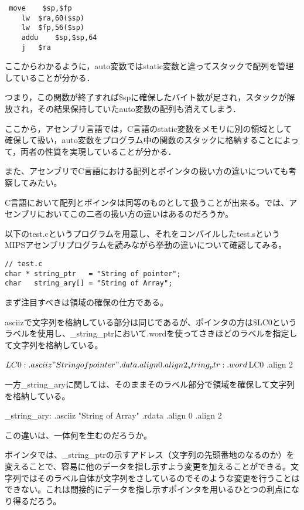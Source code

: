 \documentclass[a4j]{jarticle}
\begin{document}
\begin{verbatim}
 move    $sp,$fp
    lw  $ra,60($sp)
    lw  $fp,56($sp)
    addu    $sp,$sp,64
    j   $ra
\end{verbatim}

ここからわかるように，auto変数ではstatic変数と違ってスタックで配列を管理していることが分かる．

つまり，この関数が終了すれば\$spに確保したバイト数が足され，スタックが解放され，その結果保持していたauto変数の配列も消えてしまう．

ここから，アセンブリ言語では，C言語のstatic変数をメモリに別の領域として確保して扱い，auto変数をプログラム中の関数のスタックに格納することによって，両者の性質を実現していることが分かる．


また、アセンブリでC言語における配列とポインタの扱い方の違いについても考察してみたい。

C言語において配列とポインタは同等のものとして扱うことが出来る。では、アセンブリにおいてこの二者の扱い方の違いはあるのだろうか。

以下のtest.cというプログラムを用意し、それをコンパイルしたtest.sというMIPSアセンブリプログラムを読みながら挙動の違いについて確認してみる。

\begin{verbatim}
// test.c
char * string_ptr   = "String of pointer";
char   string_ary[] = "String of Array";
\end{verbatim}

まず注目すべきは領域の確保の仕方である。

asciizで文字列を格納している部分は同じであるが、ポインタの方は\$LC0というラベルを使用し、\_string\_ptrにおいて.wordを使ってさきほどのラベルを指定して文字列を格納している。

\begin{varbatim}
$LC0:
  .asciiz "String of pointer"
  .data
  .align  0
  .align  2
_string_ptr:
  .word $LC0
  .align  2
\end{varbatim}

一方\_string\_aryに関しては、そのままそのラベル部分で領域を確保して文字列を格納している。

\begin{varbatim}
\_string\_ary:
  .asciiz "String of Array"
  .rdata
  .align  0
  .align  2
\end{varbatim}

この違いは、一体何を生むのだろうか。

ポインタでは、\_string\_ptrの示すアドレス（文字列の先頭番地のなるのか）を変えることで、容易に他のデータを指し示すよう変更を加えることができる。文字列ではそのラベル自体が文字列をさしているのでそのような変更を行うことはできない。これは間接的にデータを指し示すポインタを用いるひとつの利点になり得るだろう。
\end{document}

